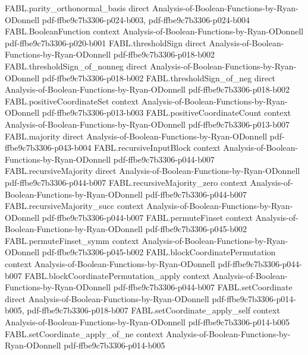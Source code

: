 \begin{theorem}
\proofstep
  {FABL.parity_orthonormal_basis}
  {direct}
  {Analysis-of-Boolean-Functions-by-Ryan-ODonnell}
  {pdf-ffbe9c7b3306-p024-b003,
    pdf-ffbe9c7b3306-p024-b004}
\proofstep
  {FABL.BooleanFunction}
  {context}
  {Analysis-of-Boolean-Functions-by-Ryan-ODonnell}
  {pdf-ffbe9c7b3306-p020-b001}
\proofstep
  {FABL.thresholdSign}
  {direct}
  {Analysis-of-Boolean-Functions-by-Ryan-ODonnell}
  {pdf-ffbe9c7b3306-p018-b002}
\proofstep
  {FABL.thresholdSign_of_nonneg}
  {direct}
  {Analysis-of-Boolean-Functions-by-Ryan-ODonnell}
  {pdf-ffbe9c7b3306-p018-b002}
\proofstep
  {FABL.thresholdSign_of_neg}
  {direct}
  {Analysis-of-Boolean-Functions-by-Ryan-ODonnell}
  {pdf-ffbe9c7b3306-p018-b002}
\proofstep
  {FABL.positiveCoordinateSet}
  {context}
  {Analysis-of-Boolean-Functions-by-Ryan-ODonnell}
  {pdf-ffbe9c7b3306-p013-b003}
\proofstep
  {FABL.positiveCoordinateCount}
  {context}
  {Analysis-of-Boolean-Functions-by-Ryan-ODonnell}
  {pdf-ffbe9c7b3306-p013-b007}
\proofstep
  {FABL.majority}
  {direct}
  {Analysis-of-Boolean-Functions-by-Ryan-ODonnell}
  {pdf-ffbe9c7b3306-p043-b004}
\proofstep
  {FABL.recursiveInputBlock}
  {context}
  {Analysis-of-Boolean-Functions-by-Ryan-ODonnell}
  {pdf-ffbe9c7b3306-p044-b007}
\proofstep
  {FABL.recursiveMajority}
  {direct}
  {Analysis-of-Boolean-Functions-by-Ryan-ODonnell}
  {pdf-ffbe9c7b3306-p044-b007}
\proofstep
  {FABL.recursiveMajority_zero}
  {context}
  {Analysis-of-Boolean-Functions-by-Ryan-ODonnell}
  {pdf-ffbe9c7b3306-p044-b007}
\proofstep
  {FABL.recursiveMajority_succ}
  {context}
  {Analysis-of-Boolean-Functions-by-Ryan-ODonnell}
  {pdf-ffbe9c7b3306-p044-b007}
\proofstep
  {FABL.permuteFinset}
  {context}
  {Analysis-of-Boolean-Functions-by-Ryan-ODonnell}
  {pdf-ffbe9c7b3306-p045-b002}
\proofstep
  {FABL.permuteFinset_symm}
  {context}
  {Analysis-of-Boolean-Functions-by-Ryan-ODonnell}
  {pdf-ffbe9c7b3306-p045-b002}
\proofstep
  {FABL.blockCoordinatePermutation}
  {context}
  {Analysis-of-Boolean-Functions-by-Ryan-ODonnell}
  {pdf-ffbe9c7b3306-p044-b007}
\proofstep
  {FABL.blockCoordinatePermutation_apply}
  {context}
  {Analysis-of-Boolean-Functions-by-Ryan-ODonnell}
  {pdf-ffbe9c7b3306-p044-b007}
\proofstep
  {FABL.setCoordinate}
  {direct}
  {Analysis-of-Boolean-Functions-by-Ryan-ODonnell}
  {pdf-ffbe9c7b3306-p014-b005,
    pdf-ffbe9c7b3306-p018-b007}
\proofstep
  {FABL.setCoordinate_apply_self}
  {context}
  {Analysis-of-Boolean-Functions-by-Ryan-ODonnell}
  {pdf-ffbe9c7b3306-p014-b005}
\proofstep
  {FABL.setCoordinate_apply_of_ne}
  {context}
  {Analysis-of-Boolean-Functions-by-Ryan-ODonnell}
  {pdf-ffbe9c7b3306-p014-b005}

\end{theorem}
